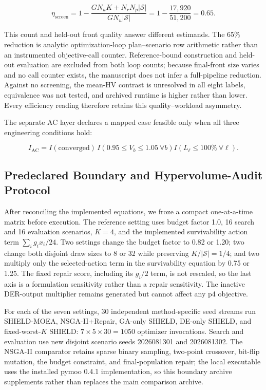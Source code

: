 \documentclass[energies,article,submit,moreauthors]{Definitions/mdpi}
\begin{document}
\[
\eta_{\mathrm{screen}}=1-\frac{GN_uK+N_rN_p|\mathcal S|}{GN_u|\mathcal S|}=1-\frac{17{,}920}{51{,}200}=0.65.
\]

This count and held-out front quality answer different estimands. The 65\% reduction is analytic optimization-loop plan--scenario row arithmetic rather than an instrumented objective-call counter. Reference-bound construction and held-out evaluation are excluded from both loop counts; because final-front size varies and no call counter exists, the manuscript does not infer a full-pipeline reduction. Against no screening, the mean-HV contrast is unresolved in all eight labels, equivalence was not tested, and archived runtime is higher rather than lower. Every efficiency reading therefore retains this quality--workload asymmetry.

The separate AC layer declares a mapped case feasible only when all three engineering conditions hold:

\[
I_{\mathrm{AC}}=I(\mathrm{converged})\,I\!\left(0.95\leq V_b\leq1.05\ \forall b\right)I\!\left(L_\ell\leq100\%\ \forall \ell\right).
\]

\subsection{Predeclared Boundary and Hypervolume-Audit Protocol}\label{predeclared-boundary-and-hypervolume-audit-protocol}

After reconciling the implemented equations, we froze a compact one-at-a-time matrix before execution. The reference setting uses budget factor 1.0, 16 search and 16 evaluation scenarios, \(K=4\), and the implemented survivability action term \(\sum_i g_ix_i/24\). Two settings change the budget factor to 0.82 or 1.20; two change both disjoint draw sizes to 8 or 32 while preserving \(K/|\mathcal S|=1/4\); and two multiply only the selected-action term in the survivability equation by 0.75 or 1.25. The fixed repair score, including its \(g_i/2\) term, is not rescaled, so the last axis is a formulation sensitivity rather than a repair sensitivity. The inactive DER-output multiplier remains generated but cannot affect any p4 objective.

For each of the seven settings, 30 independent method-specific seed streams run SHIELD-MOEA, NSGA-II+Repair, GA-only SHIELD, DE-only SHIELD, and fixed-worst-\(K\) SHIELD: \(7\times5\times30=1050\) optimizer invocations. Search and evaluation use new disjoint scenario seeds 2026081301 and 2026081302. The NSGA-II comparator retains sparse binary sampling, two-point crossover, bit-flip mutation, the budget constraint, and final-population repair; the local executable uses the installed pymoo 0.4.1 implementation, so this boundary archive supplements rather than replaces the main comparison archive.
\end{document}
